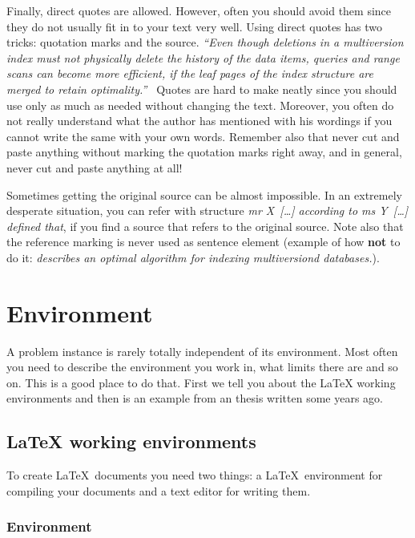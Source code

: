 \documentclass[12pt,a4paper,oneside,pdftex]{report}
\begin{document}
Finally, direct quotes are allowed. However, often you should avoid
them since they do not usually fit in to your text very well. Using
direct quotes has two tricks: quotation marks and the source. \emph{
  ``Even though deletions in a multiversion index must not physically
  delete the history of the data items, queries and range scans can
  become more efficient, if the leaf pages of the index structure are
  merged to retain optimality.''~\cite{HaapasaloThesis}} Quotes are
hard to make neatly since you should use only as much as needed
without changing the text. Moreover, you often do not really
understand what the author has mentioned with his wordings if you
cannot write the same with your own words. Remember also that never
cut and paste anything without marking the quotation marks right away,
and in general, never cut and paste anything at all!

Sometimes getting the original source can be almost impossible. In an
extremely desperate situation, you can refer with structure \emph{mr
  X~[\ldots] according to ms Y~[\ldots] defined that}, if you find a
source that refers to the original source. Note also that the
reference marking is never used as sentence element (example of how
\textbf{not} to do it: \emph{\cite{HaapasaloThesis} describes
an optimal algorithm for indexing multiversiond databases.}).



% 

\chapter{Environment}
\label{chapter:environment}

A problem instance is rarely totally independent of its environment.
Most often you need to describe the environment you work in, what
limits there are and so on. This is a good place to do that. First we
tell you about the LaTeX working environments and then is an example
from an thesis written some years ago.


\section{LaTeX working environments}
\label{sec:environments}

To create \LaTeX\ documents you need two things: a \LaTeX\ environment for
compiling your documents and a text editor for writing them.

\subsection{Environment}
\end{document}
